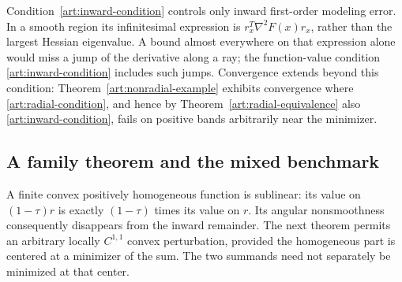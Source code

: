 Condition~\eqref{art:inward-condition} controls only inward first-order modeling error. In a smooth
region its infinitesimal expression is $r_x^T\nabla^2F(x)r_x$, rather than the
largest Hessian eigenvalue. A bound almost everywhere on that expression alone
would miss a jump of the derivative along a ray; the function-value condition
\eqref{art:inward-condition} includes such jumps. Convergence extends beyond this
condition: Theorem~\ref{art:nonradial-example} exhibits convergence where
\eqref{art:radial-condition}, and hence by Theorem~\ref{art:radial-equivalence} also
\eqref{art:inward-condition}, fails on positive bands arbitrarily near the minimizer.

\subsection{A family theorem and the mixed benchmark}

A finite convex positively homogeneous function is sublinear: its value on
$(1-\tau)r$ is exactly $(1-\tau)$ times its value on $r$. Its angular
nonsmoothness consequently disappears from the inward remainder. The next
theorem permits an arbitrary locally $C^{1,1}$ convex perturbation, provided
the homogeneous part is centered at a minimizer of the sum. The two summands
need not separately be minimized at that center.


